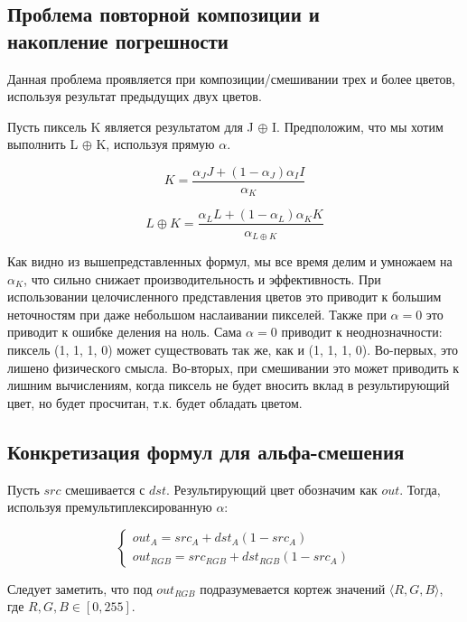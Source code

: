 \subsection{Проблема повторной композиции и \\ накопление погрешности}
Данная проблема проявляется при композиции/смешивании трех и более цветов, используя результат предыдущих двух цветов.

Пусть пиксель K является результатом для  J $\oplus$ I. Предположим, что мы хотим выполнить L $\oplus$ K, используя прямую $\alpha$.

\begin{equation}
K = \frac{\alpha_{J}J + (1-\alpha_{J})\alpha_{I}I}{\alpha_{K}}
\end{equation}

\begin{equation}
L \oplus K = \frac{\alpha_{L}L + (1-\alpha_{L})\alpha_{K}K}{\alpha_{L \oplus K}}
\end{equation}

Как видно из вышепредставленных формул, мы все время делим и умножаем на $\alpha_{K}$, что сильно снижает производительность и эффективность. При использовании целочисленного представления цветов это приводит к большим неточностям при даже небольшом наслаивании пикселей. Также при $\alpha = 0$ это приводит к ошибке деления на ноль. Сама $\alpha = 0$ приводит к неоднозначности: пиксель (1, 1, 1, 0) может существовать так же, как и (1, 1, 1, 0). Во-первых, это лишено физического смысла. Во-вторых, при смешивании это может приводить к лишним вычислениям, когда пиксель не будет вносить вклад в результирующий цвет, но будет просчитан, т.к. будет обладать цветом. 

\subsection{Конкретизация формул для альфа-смешения}
Пусть $src$ смешивается с $dst$. Результирующий цвет обозначим как $out$.
Тогда, используя премультиплексированную $\alpha$: 

\begin{equation}
\begin{cases} out_{A} = src_{A} + dst_{A}(1-src_{A}) \\
out_{RGB} = src_{RGB} + dst_{RGB}(1-src_{A})
\end{cases}
\end{equation}

Следует заметить, что под $out_{RGB}$  подразумевается кортеж значений $\langle R, G, B\rangle$, где $R, G, B \in [0, 255]$.

